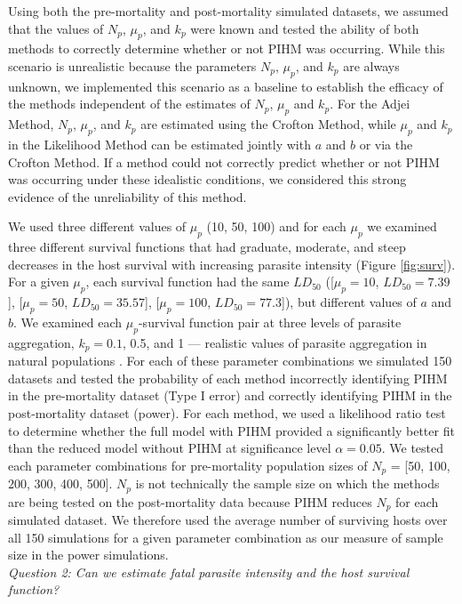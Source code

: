 \documentclass[12pt, a4paper]{article}
\begin{document}
Using both the pre-mortality and post-mortality simulated datasets,  we assumed
that the values of $N_p$, $\mu_p$, and $k_p$ were known and tested the ability of both methods to correctly determine whether or not PIHM was occurring.  While this scenario is unrealistic because the parameters $N_p$,
$\mu_p$, and $k_p$ are always unknown, we implemented this scenario as a baseline to
establish the efficacy of the methods independent of the estimates of $N_p$, $\mu_p$ and $k_p$.  For the Adjei Method, $N_p$, $\mu_p$, and $k_p$ are estimated using the Crofton Method, while $\mu_p$ and $k_p$ in the Likelihood Method can be estimated jointly with $a$ and $b$ or via the Crofton Method.   If a
method could not correctly predict whether or not PIHM was occurring under these idealistic conditions, we considered this strong evidence of the unreliability of this method.

We used three different values of $\mu_p$ (10, 50, 100) and for each $\mu_p$ we examined three different survival functions that had graduate, moderate, and steep decreases in the host survival with increasing parasite intensity (Figure \ref{fig:surv}).  For a given $\mu_p$, each survival function had the same $LD_{50}$ ([$\mu_p = 10$, $LD_{50} = 7.39$], [$\mu_p = 50$, $LD_{50} = 35.57$], [$\mu_p = 100$, $LD_{50}= 77.3$]),  but different values of $a$ and $b$.  We examined each $\mu_p$-survival function pair at  three levels of parasite
aggregation, $k_p = 0.1$, 0.5, and 1 --- realistic values of parasite aggregation in natural populations \citep{Shaw1998}.  For each of these parameter
combinations we simulated 150 datasets and tested the probability of each method incorrectly identifying PIHM in the pre-mortality dataset (Type I error) and correctly identifying PIHM in the post-mortality dataset (power).  For each method, we used a likelihood ratio test to determine whether the full model with PIHM provided a significantly better fit than the reduced model without PIHM at significance level $\alpha = 0.05$.  We tested each parameter combinations for pre-mortality population sizes of $N_p$ = [50, 100, 200, 300, 400, 500]. $N_p$ is not technically the sample size on which the methods are being
tested on the post-mortality data because PIHM reduces $N_p$ for each simulated
dataset.  We therefore used the average number of surviving hosts over all 150 simulations for a given parameter combination as our measure of sample size in the power simulations.\\

\noindent
\emph{Question 2: Can we estimate fatal parasite intensity and the host survival function?}
\end{document}
